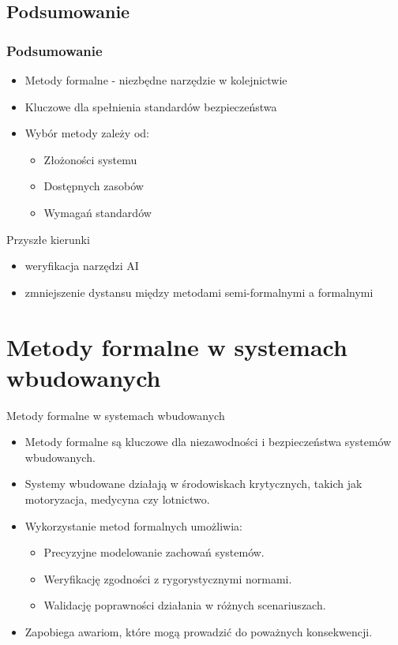\documentclass{beamer}
\begin{document}
\subsection{Podsumowanie}
\begin{frame}
\frametitle{Podsumowanie}
\begin{itemize}
\item Metody formalne - niezbędne narzędzie w kolejnictwie
\item Kluczowe dla spełnienia standardów bezpieczeństwa
\item Wybór metody zależy od:
\begin{itemize}
\item Złożoności systemu
\item Dostępnych zasobów
\item Wymagań standardów
\end{itemize}
\end{itemize}

\begin{block}{Przyszłe kierunki}
    \begin{itemize}
        \item weryfikacja narzędzi AI
        \item zmniejszenie dystansu między metodami semi-formalnymi a formalnymi
    \end{itemize}
\end{block}
\end{frame}

\section{Metody formalne w systemach wbudowanych}
\begin{frame}{Metody formalne w systemach wbudowanych}
  \begin{itemize}
    \item Metody formalne są kluczowe dla niezawodności i bezpieczeństwa systemów wbudowanych.
    \item Systemy wbudowane działają w środowiskach krytycznych, takich jak motoryzacja, medycyna czy lotnictwo.
    \item Wykorzystanie metod formalnych umożliwia:
      \begin{itemize}
        \item Precyzyjne modelowanie zachowań systemów.
        \item Weryfikację zgodności z rygorystycznymi normami.
        \item Walidację poprawności działania w różnych scenariuszach.
      \end{itemize}
    \item Zapobiega awariom, które mogą prowadzić do poważnych konsekwencji.
  \end{itemize}
\end{frame}
\end{document}
